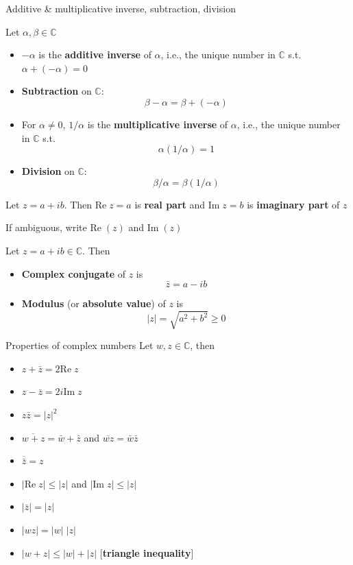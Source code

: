 \documentclass{beamer}
\def\IC{\mathbb{C}}
\def\Im{\textrm{Im}\;}
\def\Re{\textrm{Re}\;}
\begin{document}
\begin{frame}{Additive \& multiplicative inverse, subtraction, division}
\begin{definition}
Let $\alpha,\beta\in\IC$
\begin{itemize}
\item $-\alpha$ is the \textbf{additive inverse} of $\alpha$, i.e., the unique number in $\IC$ s.t. $\alpha+(-\alpha)=0$
\item \textbf{Subtraction} on $\IC$:
\[
\beta-\alpha=\beta+(-\alpha)
\]
\item For $\alpha\neq 0$, $1/\alpha$ is the \textbf{multiplicative inverse} of $\alpha$, i.e., the unique number in $\IC$ s.t.
\[
\alpha(1/\alpha)=1
\]
\item \textbf{Division} on $\IC$:
\[
\beta/\alpha=\beta(1/\alpha)
\]
\end{itemize}
\end{definition}
\end{frame}


\begin{frame}
\begin{definition}
Let $z=a+ib$. Then $\Re z=a$ is \textbf{real part} and $\Im z=b$ is \textbf{imaginary part} of $z$
\end{definition}
\vfill
If ambiguous, write $\Re(z)$ and $\Im(z)$
\vfill
\begin{definition}
Let $z=a+ib\in\IC$. Then
\begin{itemize}
\item \textbf{Complex conjugate} of $z$ is
\[
\bar z = a-ib
\]
\item \textbf{Modulus} (or \textbf{absolute value}) of $z$ is
\[
|z|=\sqrt{a^2+b^2} \geq 0
\]
\end{itemize}
\end{definition}
\end{frame}

\begin{frame}{Properties of complex numbers}
Let $w,z\in\IC$, then
\begin{itemize}
\item $z+\bar z=2\Re z$
\item $z-\bar z=2i\Im z$
\item $z\bar z=|z|^2$
\item $\overline{w+z}=\bar w+\bar z$ and $\overline{wz}=\bar w\bar z$
\item $\overline{\bar z}=z$
\item $|\Re z|\leq |z|$ and $|\Im z|\leq |z|$
\item $|\bar z|=|z|$
\item $|wz|=|w|\;|z|$
\item $|w+z|\leq |w|+|z|$ \hfill[\textbf{triangle inequality}]
\end{itemize}
\end{frame}
\end{document}
